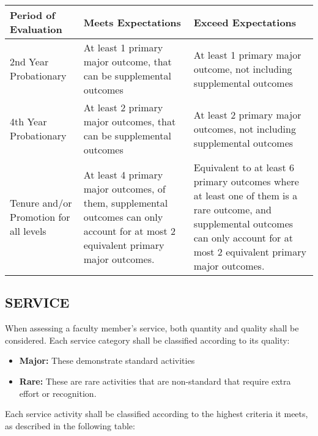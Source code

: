 \documentclass{article}
\begin{document}
\begin{longtable}{p{4cm}p{5cm}P{5cm}}

\hline
\textbf{Period of Evaluation} & \textbf{Meets Expectations} & \textbf{Exceed Expectations}\\
\hline
\endhead %
2nd Year Probationary & At least 1 primary major outcome, that can be supplemental outcomes & At least 1 primary major outcome, not including supplemental outcomes \\ \hline
4th Year Probationary & At least 2 primary major outcomes, that can be supplemental outcomes & At least 2 primary major outcomes, not including supplemental outcomes \\ \hline
Tenure and/or Promotion for all levels & At least 4 primary major outcomes, of them, supplemental outcomes can only account for at most 2 equivalent primary major outcomes. & Equivalent to at least 6 primary outcomes where at least one of them is a rare outcome, and supplemental outcomes can only account for at most 2 equivalent primary major outcomes. \\ \hline

\end{longtable}

\subsection{SERVICE}

When assessing a faculty member’s service, both quantity and quality shall be considered. Each service category shall be classified according to its quality:
\begin{itemize}
\item \textbf{Major:} These demonstrate standard activities
\item \textbf{Rare:} These are rare activities that are non-standard that require extra effort or recognition.
\end{itemize}
Each service activity shall be classified according to the highest criteria it meets, as described in the following table:
\end{document}
